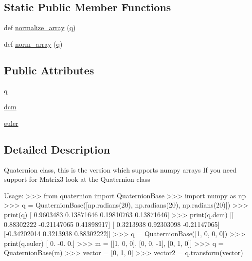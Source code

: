 \subsection*{Static Public Member Functions}
\begin{DoxyCompactItemize}
\item 
def \mbox{\hyperlink{classpymavlink_1_1quaternion_1_1QuaternionBase_a074bda381cb981dcd546d196b94f0f65}{normalize\+\_\+array}} (\mbox{\hyperlink{classpymavlink_1_1quaternion_1_1QuaternionBase_a392dcd8a214e33c00791e9fb655612b8}{q}})
\item 
def \mbox{\hyperlink{classpymavlink_1_1quaternion_1_1QuaternionBase_a2de35cb9d1f25dabffe8706230ec2a8a}{norm\+\_\+array}} (\mbox{\hyperlink{classpymavlink_1_1quaternion_1_1QuaternionBase_a392dcd8a214e33c00791e9fb655612b8}{q}})
\end{DoxyCompactItemize}
\subsection*{Public Attributes}
\begin{DoxyCompactItemize}
\item 
\mbox{\hyperlink{classpymavlink_1_1quaternion_1_1QuaternionBase_a392dcd8a214e33c00791e9fb655612b8}{q}}
\item 
\mbox{\hyperlink{classpymavlink_1_1quaternion_1_1QuaternionBase_aaba200ee55a36ebaa3c8db02513a1cfe}{dcm}}
\item 
\mbox{\hyperlink{classpymavlink_1_1quaternion_1_1QuaternionBase_a61484badb48116df5bafd66da24b3c02}{euler}}
\end{DoxyCompactItemize}


\subsection{Detailed Description}
\begin{DoxyVerb}Quaternion class, this is the version which supports numpy arrays
If you need support for Matrix3 look at the Quaternion class

Usage:
    >>> from quaternion import QuaternionBase
    >>> import numpy as np
    >>> q = QuaternionBase([np.radians(20), np.radians(20), np.radians(20)])
    >>> print(q)
    [ 0.9603483   0.13871646  0.19810763  0.13871646]
    >>> print(q.dcm)
    [[ 0.88302222 -0.21147065  0.41898917]
     [ 0.3213938   0.92303098 -0.21147065]
     [-0.34202014  0.3213938   0.88302222]]
    >>> q = QuaternionBase([1, 0, 0, 0])
    >>> print(q.euler)
    [ 0. -0.  0.]
    >>> m = [[1, 0, 0], [0, 0, -1], [0, 1, 0]]
    >>> q = QuaternionBase(m)
    >>> vector = [0, 1, 0]
    >>> vector2 = q.transform(vector)
\end{DoxyVerb}
 

